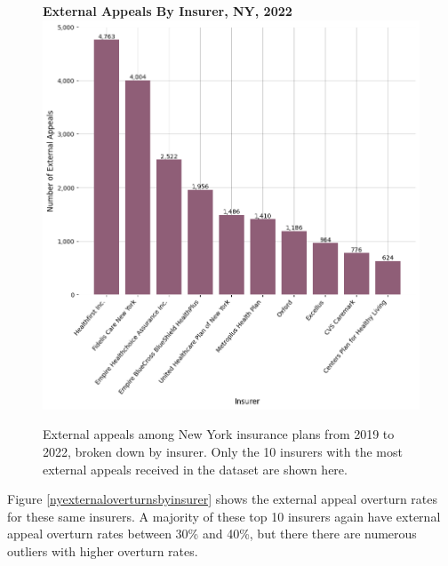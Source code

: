 \documentclass[12pt, a4paper,twoside]{report}
\theoremstyle{plain} %
\theoremstyle{definition} %
\theoremstyle{remark} %
\numberwithin{equation}{chapter}
\begin{document}
		
		\begin{figure}[h!]
			\centering
			\textbf{External Appeals By Insurer, NY, 2022}
			\includegraphics[width=.8\textwidth]{images/nys_external/external_appeals_top_insurers.png}
			\caption{External appeals among New York insurance plans from 2019 to 2022, broken down by insurer. Only the 10 insurers with the most external appeals received in the dataset are shown here.}
			\label{nyexternalbyinsurer}
		\end{figure}
		
		Figure \ref{nyexternaloverturnsbyinsurer} shows the external appeal overturn rates for these same insurers. A majority of these top 10 insurers again have external appeal overturn rates between 30\% and 40\%, but there there are numerous outliers with higher overturn rates.
		
\end{document}

